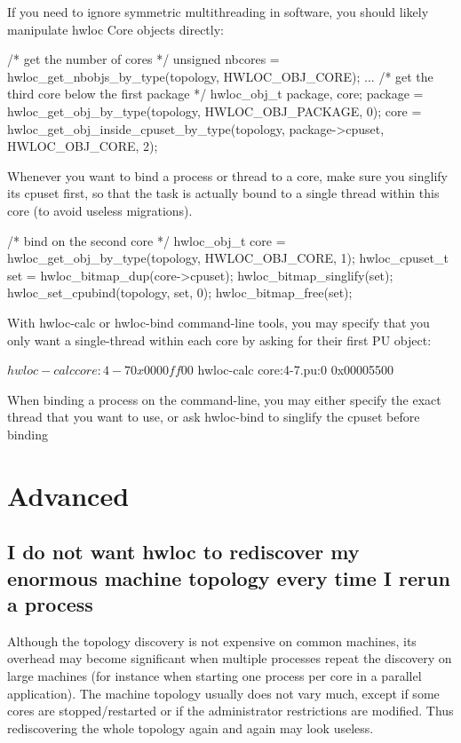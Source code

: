 If you need to ignore symmetric multithreading in software, you should likely manipulate hwloc Core objects directly\+: \begin{DoxyVerb}/* get the number of cores */
unsigned nbcores = hwloc_get_nbobjs_by_type(topology, HWLOC_OBJ_CORE);
...
/* get the third core below the first package */
hwloc_obj_t package, core;
package = hwloc_get_obj_by_type(topology, HWLOC_OBJ_PACKAGE, 0);
core = hwloc_get_obj_inside_cpuset_by_type(topology, package->cpuset,
                                           HWLOC_OBJ_CORE, 2);
\end{DoxyVerb}


Whenever you want to bind a process or thread to a core, make sure you singlify its cpuset first, so that the task is actually bound to a single thread within this core (to avoid useless migrations). \begin{DoxyVerb}/* bind on the second core */
hwloc_obj_t core = hwloc_get_obj_by_type(topology, HWLOC_OBJ_CORE, 1);
hwloc_cpuset_t set = hwloc_bitmap_dup(core->cpuset);
hwloc_bitmap_singlify(set);
hwloc_set_cpubind(topology, set, 0);
hwloc_bitmap_free(set);
\end{DoxyVerb}


With hwloc-\/calc or hwloc-\/bind command-\/line tools, you may specify that you only want a single-\/thread within each core by asking for their first PU object\+: \begin{DoxyVerb}$ hwloc-calc core:4-7
0x0000ff00
$ hwloc-calc core:4-7.pu:0
0x00005500
\end{DoxyVerb}


When binding a process on the command-\/line, you may either specify the exact thread that you want to use, or ask hwloc-\/bind to singlify the cpuset before binding 


 \hypertarget{a00394_faq2}{}\section{Advanced}\label{a00394_faq2}
\hypertarget{a00394_faq_xml}{}\subsection{I do not want hwloc to rediscover my enormous machine topology every time I rerun a process}\label{a00394_faq_xml}
Although the topology discovery is not expensive on common machines, its overhead may become significant when multiple processes repeat the discovery on large machines (for instance when starting one process per core in a parallel application). The machine topology usually does not vary much, except if some cores are stopped/restarted or if the administrator restrictions are modified. Thus rediscovering the whole topology again and again may look useless.

